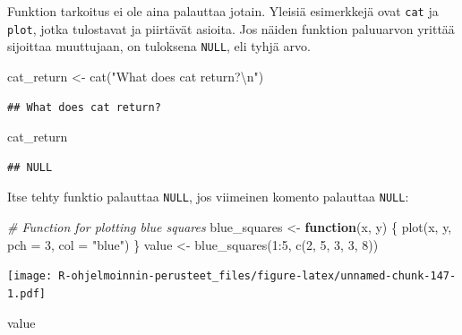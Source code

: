 \documentclass[
]{book}
\newenvironment{Shaded}{\begin{snugshade}}{\end{snugshade}}
\newcommand{\AttributeTok}[1]{\textcolor[rgb]{0.77,0.63,0.00}{#1}}
\newcommand{\CommentTok}[1]{\textcolor[rgb]{0.56,0.35,0.01}{\textit{#1}}}
\newcommand{\ControlFlowTok}[1]{\textcolor[rgb]{0.13,0.29,0.53}{\textbf{#1}}}
\newcommand{\DecValTok}[1]{\textcolor[rgb]{0.00,0.00,0.81}{#1}}
\newcommand{\FunctionTok}[1]{\textcolor[rgb]{0.00,0.00,0.00}{#1}}
\newcommand{\NormalTok}[1]{#1}
\newcommand{\OtherTok}[1]{\textcolor[rgb]{0.56,0.35,0.01}{#1}}
\newcommand{\SpecialCharTok}[1]{\textcolor[rgb]{0.00,0.00,0.00}{#1}}
\newcommand{\StringTok}[1]{\textcolor[rgb]{0.31,0.60,0.02}{#1}}
\begin{document}
Funktion tarkoitus ei ole aina palauttaa jotain. Yleisiä esimerkkejä ovat \texttt{cat} ja \texttt{plot}, jotka tulostavat ja piirtävät asioita. Jos näiden funktion paluuarvon yrittää sijoittaa muuttujaan, on tuloksena \texttt{NULL}, eli tyhjä arvo.

\begin{Shaded}
\begin{Highlighting}[]
\NormalTok{cat\_return }\OtherTok{\textless{}{-}} \FunctionTok{cat}\NormalTok{(}\StringTok{"What does cat return?}\SpecialCharTok{\textbackslash{}n}\StringTok{"}\NormalTok{)}
\end{Highlighting}
\end{Shaded}

\begin{verbatim}
## What does cat return?
\end{verbatim}

\begin{Shaded}
\begin{Highlighting}[]
\NormalTok{cat\_return}
\end{Highlighting}
\end{Shaded}

\begin{verbatim}
## NULL
\end{verbatim}

Itse tehty funktio palauttaa \texttt{NULL}, jos viimeinen komento palauttaa \texttt{NULL}:

\begin{Shaded}
\begin{Highlighting}[]
\CommentTok{\# Function for plotting blue squares}
\NormalTok{blue\_squares }\OtherTok{\textless{}{-}} \ControlFlowTok{function}\NormalTok{(x, y) \{}
  \FunctionTok{plot}\NormalTok{(x, y, }\AttributeTok{pch =} \DecValTok{3}\NormalTok{, }\AttributeTok{col =} \StringTok{"blue"}\NormalTok{)}
\NormalTok{\}}
\NormalTok{value }\OtherTok{\textless{}{-}} \FunctionTok{blue\_squares}\NormalTok{(}\DecValTok{1}\SpecialCharTok{:}\DecValTok{5}\NormalTok{, }\FunctionTok{c}\NormalTok{(}\DecValTok{2}\NormalTok{, }\DecValTok{5}\NormalTok{, }\DecValTok{3}\NormalTok{, }\DecValTok{3}\NormalTok{, }\DecValTok{8}\NormalTok{))}
\end{Highlighting}
\end{Shaded}

\texttt{[image: R-ohjelmoinnin-perusteet\_files/figure-latex/unnamed-chunk-147-1.pdf]}

\begin{Shaded}
\begin{Highlighting}[]
\NormalTok{value}
\end{Highlighting}
\end{Shaded}
\end{document}
